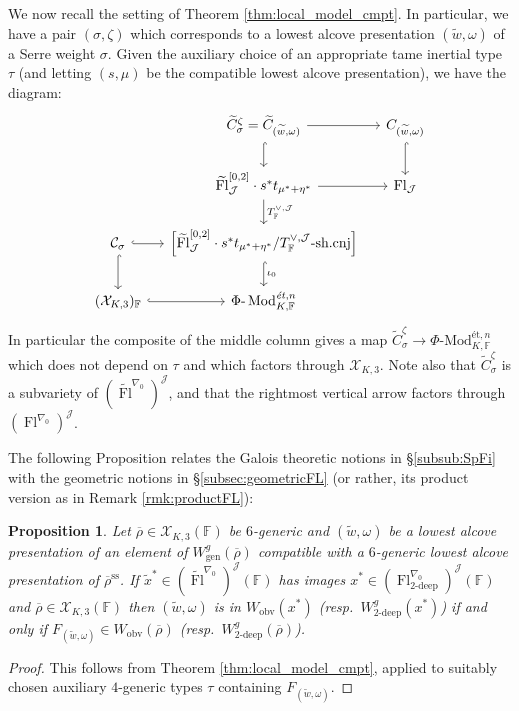 \documentclass[oneside,a4paper,english, 11pt]{amsart}
\theoremstyle{plain}
\theoremstyle{plain}
\newtheorem{prop}[thm]{Proposition}
\theoremstyle{plain}
\theoremstyle{plain}
\theoremstyle{plain}
\theoremstyle{plain}
\theoremstyle{definition}
\theoremstyle{definition}
\theoremstyle{definition}
\theoremstyle{remark}
\numberwithin{equation}{section}
\newcommand{\F}{\mathbb{F}}
\newcommand{\cC}{\mathcal{C}}
\newcommand{\cJ}{\mathcal{J}}
\newcommand{\cX}{\mathcal{X}}
\newcommand{\semis}{\mathrm{ss}}
\newcommand{\tld}[1]{\widetilde{#1}}
\newcommand{\rhobar}{\overline{\rho}}
\newcommand{\obv}{\mathrm{obv}}
\DeclareMathOperator{\Mod}{Mod}
\DeclareMathOperator{\Fl}{Fl}
\newcommand{\ra}{\rightarrow}
\begin{document}
We now recall the setting of Theorem \ref{thm:local_model_cmpt}.
In particular, we have a pair $(\sigma,\zeta)$ which corresponds to a lowest alcove presentation $(\tld{w},\omega)$ of a Serre weight $\sigma$. Given the auxiliary choice of an appropriate tame inertial type $\tau$ (and letting $(s,\mu)$ be the compatible lowest alcove presentation), we have the diagram:
\begin{equation}
\begin{tikzcd}[column sep=small]
&\tld{C}^{\zeta}_\sigma=\tld{C}_{(\tld{w},\omega)}\ar[hook]{d}\ar{r} & C_{(\tld{w},\omega)}\ar[hook]{d}
\\
& \tld{\Fl}^{[0,2]}_{\cJ}\cdot s^*t_{\mu^*+\eta^*}\ar{d}{T^{\vee,\cJ}_{\F}}\ar{r}& \Fl_{\cJ}
\\
\cC_\sigma\ar[hook]{r}\ar[hook]{d}&\Big[\tld{\Fl}^{[0,2]}_{\cJ}\cdot s^*t_{\mu^*+\eta^*}/T^{\vee, \cJ}_{\F}\text{\textrm{-sh.cnj}}\Big]\ar[hook]{d}{\iota_0}\\
(\cX_{K,3})_{\F}\ar[hook]{r}&\Phi\text{-}\Mod^{\text{\emph{\'et}},n}_{K, \F}
\end{tikzcd}
\end{equation}
In particular the composite of the middle column gives a map $\tld{C}^{\zeta}_{\sigma}\ra\Phi\text{-Mod}_{K,\F}^{\text{\'et},n}$  which does not depend on $\tau$ and which factors through $\cX_{K,3}$. Note also that $\tld{C}^{\zeta}_{\sigma}$ is a subvariety of $(\tld{\Fl}^{\nabla_0})^{\cJ}$, and that the rightmost vertical arrow factors through $(\Fl^{\nabla_0})^{\cJ}$.


The following Proposition relates the Galois theoretic notions in \S \ref{subsub:SpFi} with the geometric notions in \S \ref{subsec:geometricFL} (or rather, its product version as in Remark \ref{rmk:productFL}):
\begin{prop}\label{prop:LMweights}
%
Let $\rhobar\in \cX_{K,3}(\F)$ be $6$-generic and $(\tld{w},\omega)$ be a lowest alcove presentation of an element of $W^g_{\textrm{gen}}(\rhobar)$ compatible with a $6$-generic lowest alcove presentation of $\rhobar^{\semis}$.
If $\tld{x}^* \in (\tld{\Fl}^{\nabla_0})^{\cJ}(\F)$ has images $x^* \in (\Fl_{2\textrm{-deep}}^{\nabla_0})^{\cJ}(\F)$ and $\rhobar \in \cX_{K,3}(\F)$
%
then $(\tld{w},\omega)$ is in $W_{\obv}(x^*)$ (resp.~$W^g_{2\textrm{-deep}}(x^*)$) if and only if $F_{(\tld{w},\omega)} \in W_{\obv}(\rhobar)$ (resp.~$W^g_{2\textrm{-deep}}(\rhobar)$). 
%
\end{prop}
\begin{proof}
This follows from Theorem \ref{thm:local_model_cmpt}, applied to suitably chosen auxiliary $4$-generic types $\tau$ containing $F_{(\tld{w},\omega)}$. 
\end{proof}
\end{document}
